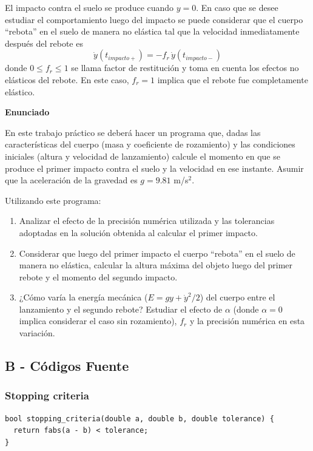 \documentclass[a4paper]{article}
\begin{document}
El impacto contra el suelo se produce cuando $y=0$. En caso que se desee estudiar el comportamiento luego del impacto se puede considerar que el cuerpo ``rebota'' en el suelo de manera no elástica tal que la velocidad inmediatamente después del rebote es 
\begin{equation}
\dot{y}(t_{impacto+}) = - f_r \, \dot{y}(t_{impacto-})
\end{equation}
donde $0 \leq f_r \leq 1$ se llama factor de restitución y toma en cuenta los efectos no elásticos del rebote. En este caso, $f_r = 1$ implica que el rebote fue completamente elástico.


{\bf Enunciado}

En este trabajo práctico se deberá hacer un programa que, dadas las características del cuerpo (masa y coeficiente de rozamiento) y las condiciones iniciales (altura y velocidad de lanzamiento) calcule el momento en que se produce el primer impacto contra el suelo y la velocidad en ese instante. Asumir que la aceleración de la gravedad es $g = 9.81$ m/s$^2$.

Utilizando este programa:
\begin{enumerate}
  \item Analizar el efecto de la precisión numérica utilizada y las tolerancias adoptadas en la solución obtenida al calcular el primer impacto.
  
  \item Considerar que luego del primer impacto el cuerpo ``rebota'' en el suelo de manera no elástica, calcular la altura máxima del objeto luego del primer rebote y el momento del segundo impacto.

  \item ¿Cómo varía la energía mecánica ($E = g y +\dot{y}^2/2$) del cuerpo entre el lanzamiento y el segundo rebote? Estudiar el efecto de $\alpha$ (donde $\alpha = 0$ implica considerar el caso sin rozamiento), $f_r$ y la precisión numérica en esta variación.
\end{enumerate}

\newpage

\subsection{B - Códigos Fuente}

\subsubsection{Stopping criteria}
\begin{verbatim}
bool stopping_criteria(double a, double b, double tolerance) {
  return fabs(a - b) < tolerance;
}
\end{verbatim}
\end{document}
